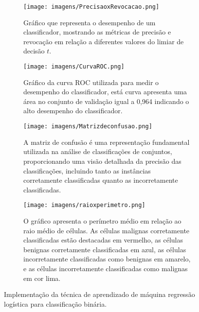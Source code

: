 \documentclass{pssbmac}
\begin{document}
\begin{figure}[H]
    \centering
    \begin{subfigure}[t]{0.49\textwidth}
        \centering
        \texttt{[image: imagens/PrecisaoxRevocacao.png]}
        \caption{Gráfico que representa o desempenho de um classificador, mostrando as métricas de precisão e revocação em relação a diferentes valores do limiar de decisão $t$.}
        \label{subfig1}
    \end{subfigure}
    \hfill
    \begin{subfigure}[t]{0.49\textwidth}
        \centering
        \texttt{[image: imagens/CurvaROC.png]}
        \caption{Gráfico da curva ROC utilizada para medir o desempenho do classificador, está curva apresenta uma área no conjunto de validação igual a 0,964 indicando o alto desempenho do classificador.}
        \label{subfig2}
    \end{subfigure}
    \bigskip
    \begin{subfigure}[b]{0.49\textwidth}
        \centering
        \texttt{[image: imagens/Matrizdeconfusao.png]}
        \caption{A matriz de confusão é uma representação fundamental utilizada na análise de classificações de conjuntos, proporcionando uma visão detalhada da precisão das classificações, incluindo tanto as instâncias corretamente classificadas quanto as incorretamente classificadas.}
        \label{subfig3}
    \end{subfigure}
    \hfill
    \begin{subfigure}[b]{0.49\textwidth}
        \centering
        \texttt{[image: imagens/raioxperimetro.png]}
        \caption{O gráfico apresenta o perímetro médio em relação ao raio médio de células. As células malignas corretamente classificadas estão destacadas em vermelho, as células benignas corretamente classificadas em azul, as células incorretamente classificadas como benignas em amarelo, e as células incorretamente classificadas como malignas em cor lima.}
        \label{subfig4}
    \end{subfigure}
    \caption{Implementação da técnica de aprendizado de máquina regressão logística para classificação binária.}
    \label{reglog}
\end{figure}
\end{document}
